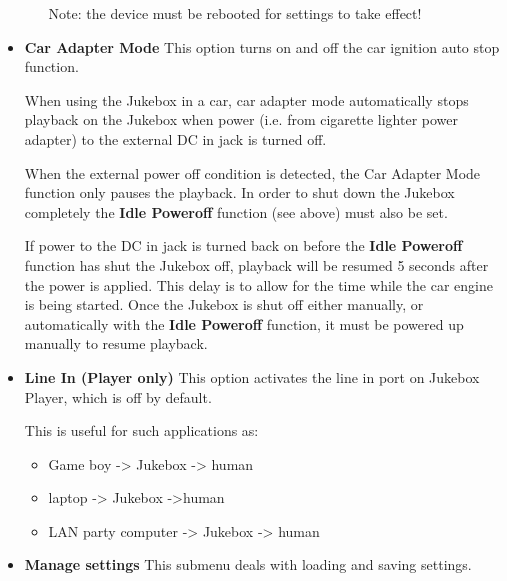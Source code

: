 \begin{itemize}
\begin{itemize}
Note: the device must be rebooted for settings to take effect! 
\end{itemize}

\item \textbf{Car Adapter Mode}
This option turns on and off the car ignition auto stop
function. 

When using the Jukebox in a car, car adapter mode automatically stops
playback on the Jukebox when power (i.e. from cigarette lighter power
adapter) to the external DC in jack is turned off. 

When the external power off condition is detected, the Car Adapter Mode
function only pauses the playback. In order to shut down the Jukebox
completely the \textbf{Idle Poweroff} function (see above) must also be
set.

If power to the DC in jack is turned back on before the \textbf{Idle
Poweroff}  function has shut the Jukebox off, playback will be resumed
5 seconds after the power is applied. This delay is to allow for the
time while the car engine is being started. Once the Jukebox is shut
off either manually, or automatically with the \textbf{Idle Poweroff
}function, it must be powered up manually to resume playback.

\item \textbf{Line In (Player only)}
This option activates the line in port on Jukebox Player, which
is off by default.

This is useful for such applications as:
\begin{itemize}
\item Game boy {}-{\textgreater} Jukebox {}-{\textgreater} human
\item laptop {}-{\textgreater} Jukebox {}-{\textgreater}human
\item LAN party computer {}-{\textgreater} Jukebox {}-{\textgreater} human 
\end{itemize}

\item \textbf{Manage settings}
This submenu deals with loading and saving settings.


\end{itemize}

